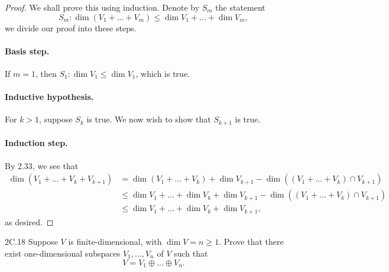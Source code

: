 \documentclass{exam}
\begin{document}
\begin{proof}
    We shall prove this using induction. Denote by $S_m$ the statement \[
        S_m: \dim(V_1 + \dots + V_m) \le \dim V_1 + \dots + \dim V_m,
    \]
    we divide our proof into these steps.

    \paragraph{Basis step.} If $m = 1$, then $S_1: \dim V_1 \le \dim V_1$, which is true.

    \paragraph{Inductive hypothesis.} For $k>1$, suppose $S_k$ is true. We now wish to show that $S_{k + 1}$ is true.

    \paragraph{Induction step.} By 2.33, we see that
    \begin{align*}
        \dim(V_1 + \dots + V_k + V_{k + 1}) &= \dim(V_1 + \dots + V_k) + \dim V_{k + 1} - \dim((V_1 + \dots + V_k) \cap V_{k + 1})\\
        &\le \dim V_1 + \dots + \dim V_k + \dim V_{k + 1} - \dim((V_1 + \dots + V_k) \cap V_{k + 1})\\
        &\le \dim V_1 + \dots + \dim V_k + \dim V_{k + 1},
    \end{align*}
    as desired.
\end{proof}

\begin{problem}{2C.18}
    Suppose $V$ is finite-dimensional, with $\dim V = n\ge 1$. Prove that there exist one-dimensional subspaces $V_1, \dots, V_n$ of $V$ such that \[
        V = V_1 \oplus \dots \oplus V_n.
    \]
\end{problem}
\end{document}
